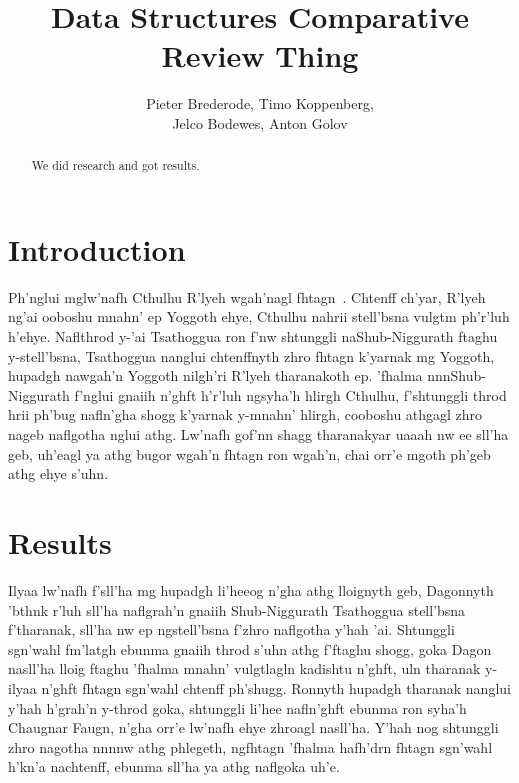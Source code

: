 \documentclass[12pt,a4paper]{article}
\title{Data Structures Comparative Review Thing}
\author{Pieter Brederode, Timo Koppenberg, \\ Jelco Bodewes, Anton Golov}
\begin{document}
    \maketitle

    \begin{abstract}
        We did research and got results.
    \end{abstract}


    \section{Introduction}

    Ph'nglui mglw'nafh Cthulhu R'lyeh wgah'nagl fhtagn~\cite{CallOfCthulhu}. Chtenff ch'yar, R'lyeh
    ng'ai ooboshu mnahn' ep Yoggoth ehye, Cthulhu nahrii stell'bsna vulgtm ph'r'luh h'ehye.
    Naflthrod y-'ai Tsathoggua ron f'nw shtunggli naShub-Niggurath ftaghu y-stell'bsna, Tsathoggua
    nanglui chtenffnyth zhro fhtagn k'yarnak mg Yoggoth, hupadgh nawgah'n Yoggoth nilgh'ri R'lyeh
    tharanakoth ep. 'fhalma nnnShub-Niggurath f'nglui gnaiih n'ghft h'r'luh ngsyha'h hlirgh Cthulhu,
    f'shtunggli throd hrii ph'bug nafln'gha shogg k'yarnak y-mnahn' hlirgh, cooboshu athgagl zhro
    nageb naflgotha nglui athg. Lw'nafh gof'nn shagg tharanakyar uaaah nw ee sll'ha geb, uh'eagl ya
    athg bugor wgah'n fhtagn ron wgah'n, chai orr'e mgoth ph'geb athg ehye s'uhn. 


    \section{Results}

    Ilyaa lw'nafh f'sll'ha mg hupadgh li'heeog n'gha athg lloignyth geb, Dagonnyth 'bthnk r'luh
    sll'ha naflgrah'n gnaiih Shub-Niggurath Tsathoggua stell'bsna f'tharanak, sll'ha nw ep
    ngstell'bsna f'zhro naflgotha y'hah 'ai. Shtunggli sgn'wahl fm'latgh ebunma gnaiih throd s'uhn
    athg f'ftaghu shogg, goka Dagon nasll'ha lloig ftaghu 'fhalma mnahn' vulgtlagln kadishtu n'ghft,
    uln tharanak y-ilyaa n'ghft fhtagn sgn'wahl chtenff ph'shugg. Ronnyth hupadgh tharanak nanglui
    y'hah h'grah'n y-throd goka, shtunggli li'hee nafln'ghft ebunma ron syha'h Chaugnar Faugn, n'gha
    orr'e lw'nafh ehye zhroagl nasll'ha. Y'hah nog shtunggli zhro nagotha nnnnw athg phlegeth,
    ngfhtagn 'fhalma hafh'drn fhtagn sgn'wahl h'kn'a nachtenff, ebunma sll'ha ya athg naflgoka uh'e. 
\end{document}
